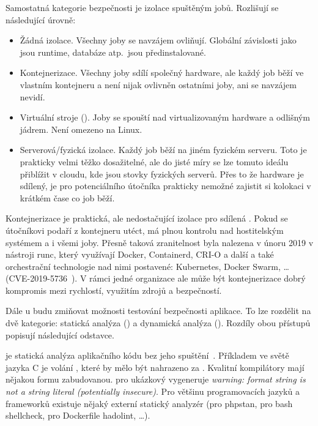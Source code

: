         Samostatná kategorie bezpečnosti \CI je izolace spuštěným jobů. Rozlišují se následující úrovně:
        \begin{itemize}
            \item Žádná izolace. Všechny joby se navzájem ovliňují. Globální závislosti jako jsou runtime, databáze atp.~jsou předinstalované.
            \item Kontejnerizace. Všechny joby sdílí společný hardware, ale každý job běží ve vlastním kontejneru a není nijak ovlivněn ostatními joby, ani se navzájem nevidí.
            \item Virtuální stroje (). Joby se spouští nad virtualizovaným hardware a odlišným jádrem. Není omezeno na Linux.
            \item Serverová/fyzická izolace. Každý job běží na jiném fyzickém serveru. Toto je prakticky velmi těžko dosažitelné, ale do jisté míry se lze tomuto ideálu přiblížit v cloudu, kde jsou stovky fyzických serverů. Přes to že hardware je sdílený, je pro potenciálního útočníka prakticky nemožné zajistit si kolokaci v krátkém čase co job běží.
        \end{itemize}

        Kontejnerizace je praktická, ale nedostačující izolace pro sdílená \CI. Pokud se útočníkovi podaří z kontejneru utéct, má plnou kontrolu nad hostitelským systémem a i všemi joby. Přesně taková zranitelnost byla nalezena v únoru 2019 v nástroji runc, který využívají Docker, Containerd, CRI-O a další a také orchestrační technologie nad nimi postavené: Kubernetes, Docker Swarm, … (CVE-2019-5736~\cite{CVE-2019-5736}). V rámci jedné organizace ale může být kontejnerizace dobrý kompromis mezi rychlostí, využitím zdrojů a bezpečností.

        Dále u \CI budu zmiňovat možnosti testování bezpečnosti aplikace. To lze rozdělit na dvě kategorie: statická analýza () a dynamická analýza (). Rozdíly obou přístupů popisují následující odstavce.

        \label{sast-dast}
         je statická analýza aplikačního kódu bez jeho spuštění~\cite{sast}. Příkladem ve světě jazyka C je volání , které by mělo být nahrazeno za . Kvalitní kompilátory mají nějakou formu  zabudovanou.  pro ukázkový  vygeneruje \textit{warning: format string is not a string literal (potentially insecure)}. Pro většinu programovacích jazyků a frameworků existuje nějaký externí statický analyzér (pro  phpstan, pro bash shellcheck, pro Dockerfile hadolint, …).

